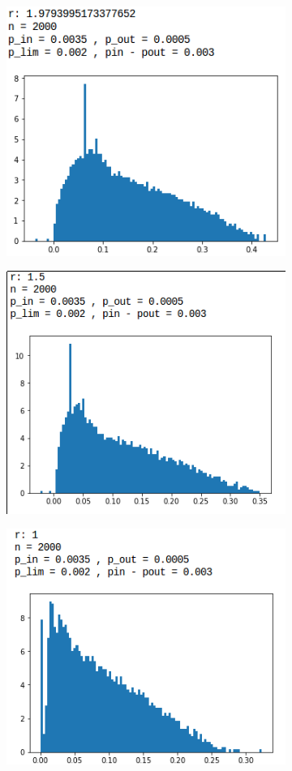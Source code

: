 \begin{figure}[H]
\begin{subfigure}{.5\textwidth}
		\label{bh3}
	\end{subfigure}
	\begin{subfigure}{.5\textwidth}
		\centering
		\includegraphics[scale=0.4]{static/bh_2.png}
		\label{bh2}
	\end{subfigure}
	\begin{subfigure}{.5\textwidth}
		\centering
		\includegraphics[scale=0.4]{static/bh_1_5.png}
		\label{bh15}
	\end{subfigure}
	\begin{subfigure}{.5\textwidth}
		\centering
		\includegraphics[scale=0.4]{static/bh_1.png}

\end{subfigure}
\end{figure}
